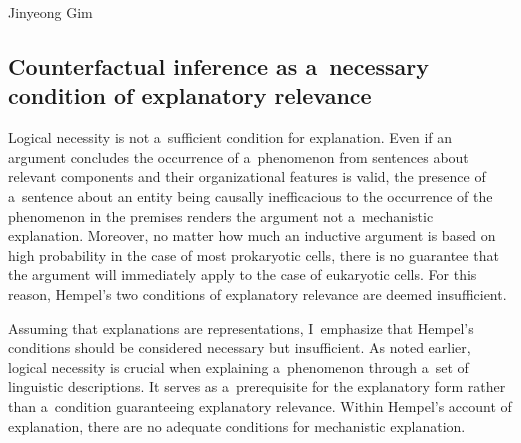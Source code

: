\begin{artengenv}{Jinyeong Gim}
\subsection{Counterfactual inference as a~necessary condition of explanatory relevance}

Logical necessity is not a~sufficient condition for explanation. Even if an argument concludes the occurrence of a~phenomenon from sentences about relevant components and their organizational features is valid, the presence of a~sentence about an entity being causally inefficacious to the occurrence of the phenomenon in the premises renders the argument not a~mechanistic explanation. Moreover, no matter how much an inductive argument is based on high probability in the case of most prokaryotic cells, there is no guarantee that the argument will immediately apply to the case of eukaryotic cells. For this reason, Hempel's two conditions of explanatory relevance are deemed insufficient.

Assuming that explanations are representations, I~emphasize that Hempel's conditions should be considered necessary but insufficient. As noted earlier, logical necessity is crucial when explaining a~phenomenon through a~set of linguistic descriptions. It serves as a~prerequisite for the explanatory form rather than a~condition guaranteeing explanatory relevance. Within Hempel's account of explanation, there are no adequate conditions for mechanistic explanation.


\end{artengenv}
